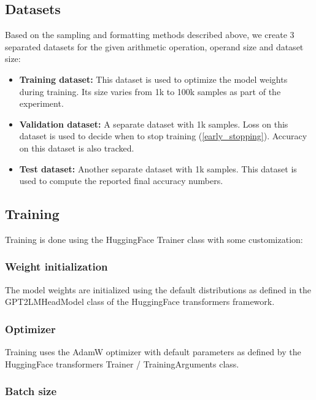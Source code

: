 \subsection{Datasets}

Based on the sampling and formatting methods described above, we create 3 separated datasets for the given arithmetic operation, operand size and dataset size:

\begin{itemize}
	\item \textbf{Training dataset:} This dataset is used to optimize the model weights during training. Its size varies from 1k to 100k samples as part of the experiment.
	\item \textbf{Validation dataset:} A separate dataset with 1k samples. Loss on this dataset is used to decide when to stop training (\cref{early_stopping}). Accuracy on this dataset is also tracked.
	\item \textbf{Test dataset:} Another separate dataset with 1k samples. This dataset is used to compute the reported final accuracy numbers.
\end{itemize} 

\subsection{Training}

Training is done using the HuggingFace Trainer class with some customization:

\subsubsection{Weight initialization}

The model weights are initialized using the default distributions as defined in the GPT2LMHeadModel class of the HuggingFace transformers framework.

\subsubsection{Optimizer}

Training uses the AdamW optimizer with default parameters as defined by the HuggingFace transformers Trainer / TrainingArguments class.

\subsubsection{Batch size}
\label{expsetup:batchsize}

